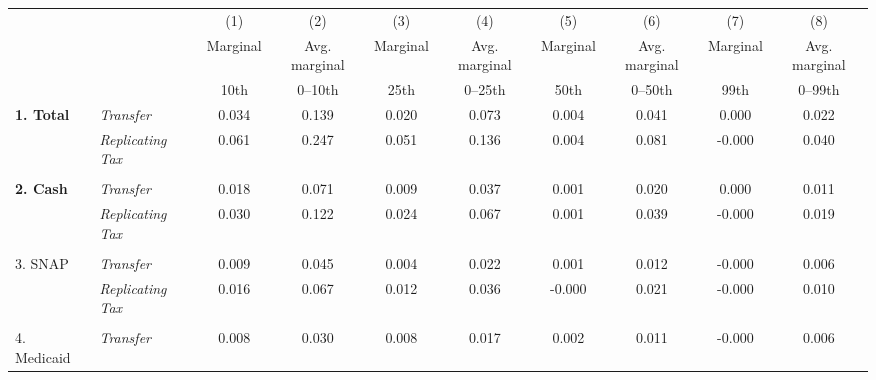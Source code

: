 \begin{tabular}{llcccccccc}
\hline 
\hline
& & (1) & (2) & (3) & (4) & (5) & (6) & (7) & (8)  \\ 
\multicolumn{1}{l}{} &                          & \multicolumn{1}{c}{Marginal}        & \multicolumn{1}{c}{Avg. marginal}  & \multicolumn{1}{c}{Marginal}        & \multicolumn{1}{c}{Avg. marginal}  & \multicolumn{1}{c}{Marginal}        & \multicolumn{1}{c}{Avg. marginal}  & \multicolumn{1}{c}{Marginal}        & \multicolumn{1}{c}{Avg. marginal}  \\
                     &                 & 
\multicolumn{1}{c}{10th } & \multicolumn{1}{c}{0--10th
  } & \multicolumn{1}{c}{25th } &
\multicolumn{1}{c}{0--25th } & \multicolumn{1}{c}{50th
  } & \multicolumn{1}{c}{0--50th } &
\multicolumn{1}{c}{99th } & \multicolumn{1}{c}{0--99th
  } \\
\hline
\textbf{1. Total }               & \textit{Transfer}        & 0.034             & 0.139                & 0.020             & 0.073                & 0.004             & 0.041                & 0.000             & 0.022                \\
                     & \textit{Replicating Tax}
& 0.061               & 0.247
& 0.051               & 0.136
& 0.004               & 0.081
& -0.000               & 0.040
\\ \\
\textbf{2. Cash }                 & \textit{Transfer}        & 0.018              & 0.071                 & 0.009              & 0.037                 & 0.001              & 0.020                 & 0.000              & 0.011                 \\
                     & \textit{Replicating Tax} & 0.030
& 0.122                   & 0.024
& 0.067                   & 0.001
& 0.039                   & -0.000
& 0.019                   \\
\\
3. SNAP                 & \textit{Transfer}        & 0.009              & 0.045                 & 0.004              & 0.022                 & 0.001              & 0.012                 & -0.000              & 0.006                 \\
                     & \textit{Replicating Tax} & 0.016
& 0.067                   & 0.012
& 0.036                   & -0.000
& 0.021                   & -0.000
& 0.010                   \\ \\
4. Medicaid             & \textit{Transfer}        & 0.008          & 0.030             & 0.008          & 0.017             & 0.002          & 0.011             & -0.000          & 0.006             \\

\end{tabular}
